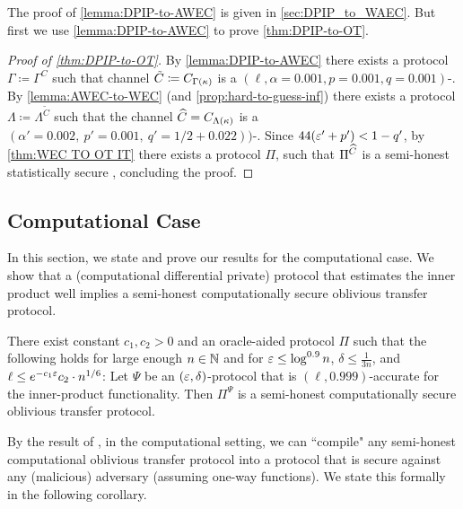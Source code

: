 The proof of \cref{lemma:DPIP-to-AWEC} is given in \cref{sec:DPIP_to_WAEC}. But first we use \cref{lemma:DPIP-to-AWEC} to prove \cref{thm:DPIP-to-OT}. 

\begin{proof}[Proof of \cref{thm:DPIP-to-OT}]
By \cref{lemma:DPIP-to-AWEC} there exists a \ppt protocol $\Gamma\coloneqq\Gamma^C$ such that channel $\tilde{C}\coloneqq C_{\Gamma(\kappa)}$ is a $(\ell, \alpha=0.001, p=0.001, q=0.001)$-\AWEC. By \cref{lemma:AWEC-to-WEC} (and \cref{prop:hard-to-guess-inf}) there exists a \ppt protocol $\Lambda\coloneqq\Lambda^{\tilde{C}}$ such that the channel $\widehat{C}=C_{\Lambda(\kappa)}$ is a $(\alpha'=0.002,\: p' = 0.001 ,\:  q' = 1/2 + 0.022))$-\WEC. Since $44(\varepsilon'+p')<1-q'$, by  \cref{thm:WEC TO OT IT} there exists a \ppt protocol $\Pi$, such that $\Pi^{\widehat{C}}$ is a semi-honest statistically secure \OT, concluding the proof.
\end{proof}


\subsection{Computational Case}\label{sec:DP TO OT Comp}


In this section, we state and prove our results for the computational case. We show that a \CDP (computational differential private) protocol that estimates the inner product well implies a semi-honest computationally secure oblivious transfer protocol. 


\begin{theorem}\label{thm:CDPIP-to-OT}
There exist constant $c_1,c_2 > 0$ and an oracle-aided \ppt protocol $\Pi$ such that the following holds for large enough $n \in {\mathbb{N}}$ and for 
$\varepsilon \leq \log^{0.9} n$, $\delta \leq \frac1{3n}$, and $\ell \leq e^{-c_1  \varepsilon}  c_2\cdot n^{1/6}$:
    Let $\Psi$ be an $(\varepsilon,\delta)$-\CDP protocol that is $(\ell,0.999)$-accurate for the inner-product functionality. 
    Then $\Pi^\Psi$ is a semi-honest computationally secure oblivious transfer protocol.
\end{theorem}

By the result of \cite{GoldreichMW87}, in the computational setting, we can ``compile" any semi-honest computational oblivious transfer protocol into a protocol that is secure against any \ppt (malicious) adversary (assuming one-way functions). We state this formally in the following corollary.

